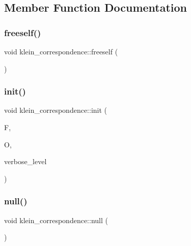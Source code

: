 \subsection{Member Function Documentation}
\mbox{\label{classklein__correspondence_a4f2fcdff050f5a8f1b19dda0a55ae063}} 
\subsubsection{\texorpdfstring{freeself()}{freeself()}}
{\footnotesize\ttfamily void klein\+\_\+correspondence\+::freeself (\begin{DoxyParamCaption}{ }\end{DoxyParamCaption})}

\mbox{\label{classklein__correspondence_a9f555dc65174ab66579e1118bd9b4ca0}} 
\subsubsection{\texorpdfstring{init()}{init()}}
{\footnotesize\ttfamily void klein\+\_\+correspondence\+::init (\begin{DoxyParamCaption}\item[{\mbox{\hyperlink{classfinite__field}{finite\+\_\+field}} $\ast$}]{F,  }\item[{\mbox{\hyperlink{classorthogonal}{orthogonal}} $\ast$}]{O,  }\item[{\mbox{\hyperlink{galois_8h_a09fddde158a3a20bd2dcadb609de11dc}{I\+NT}}}]{verbose\+\_\+level }\end{DoxyParamCaption})}

\mbox{\label{classklein__correspondence_a633b72e22929d30fc79cd6b8e6926e08}} 
\subsubsection{\texorpdfstring{null()}{null()}}
{\footnotesize\ttfamily void klein\+\_\+correspondence\+::null (\begin{DoxyParamCaption}{ }\end{DoxyParamCaption})}

